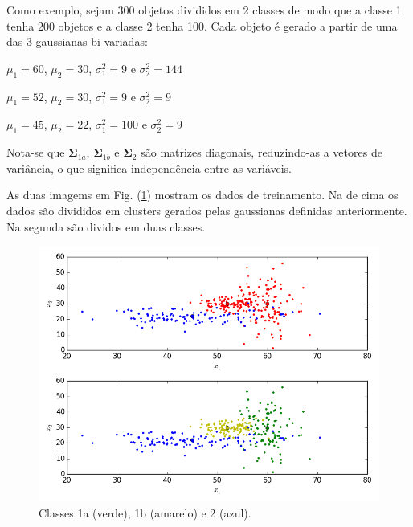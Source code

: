 \documentclass[a4paper,12pt,twocolumn]{article}
\newcommand{\figureref}[1]{Fig. (\ref{fig:#1})}
\begin{document}
Como exemplo, sejam 300 objetos divididos em 2 classes de modo que a classe 1 tenha 200 objetos e a classe 2 tenha 100. Cada objeto é gerado a partir de uma das 3 gaussianas bi-variadas:

\begin{description}\itemsep0pt
    \item[1a:] $\mu_1 = 60$, $\mu_2 = 30$, $\sigma_1^2 = 9$ e $\sigma_2^2 = 144$
    \item[1b:] $\mu_1 = 52$, $\mu_2 = 30$, $\sigma_1^2 = 9$ e $\sigma_2^2 = 9$
    \item[2:] $\mu_1 = 45$, $\mu_2 = 22$, $\sigma_1^2 = 100$ e $\sigma_2^2 = 9$
\end{description}

\noindent Nota-se que $\boldsymbol{\Sigma}_{1a}$, $\boldsymbol{\Sigma}_{1b}$ e $\boldsymbol{\Sigma}_2$ são matrizes diagonais, reduzindo-as a vetores de variância, o que significa independência entre as variáveis.

As duas imagems em \figureref{samples} mostram os dados de treinamento. Na de cima os dados são divididos em clusters gerados pelas gaussianas definidas anteriormente. Na segunda são dividos em duas classes.

\begin{figure}[ht]
    \centering
    \includegraphics[width=\columnwidth]{samples}
    \caption{Classes 1a (verde), 1b (amarelo) e 2 (azul).}
    \label{fig:samples}
\end{figure}
\end{document}
